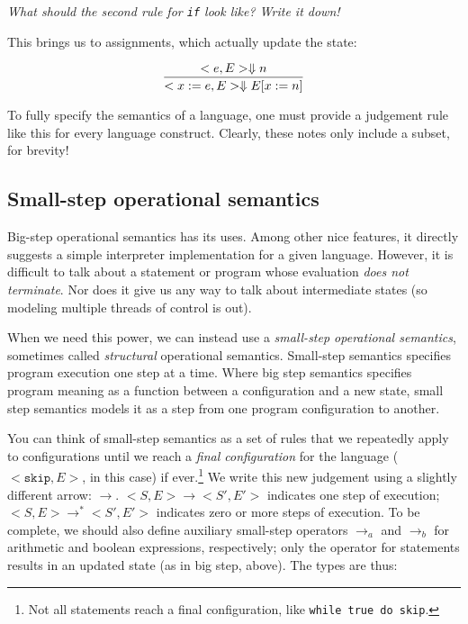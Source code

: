 \documentclass[11pt]{article}
\begin{document}
\noindent \emph{What should the second rule for \texttt{if} look like? Write it down!}

\vspace{1em}

\noindent This brings us to assignments, which actually update the state:

\[
\infer{<x := e, E> \Downarrow E[x := n]} {<e, E> \Downarrow n} 
\]


To fully specify the semantics of a language, one must provide a judgement rule
like this for every language construct.  Clearly, these notes only include a
subset, for brevity!

\subsection{Small-step operational semantics}

Big-step operational semantics has its uses.  Among other
nice features, it directly suggests a simple interpreter
implementation for a given language.  However, it is difficult to talk about a
statement or program whose evaluation \emph{does not terminate}.  Nor does it give us any way
to talk about intermediate states (so modeling multiple threads of control is
out).  

When we need this power, we can instead use a \emph{small-step operational
  semantics}, sometimes called \emph{structural} operational semantics.
Small-step semantics specifies program execution one step at a time.  Where
big step semantics specifies program meaning as a function between a
configuration and a new state, small step semantics models it as a step from one
program configuration to another.  

You can think of small-step semantics as a set of rules that we repeatedly apply to
configurations until we reach a \emph{final configuration} for the language ($<\mathtt{skip}, E>$,
in this case)
if ever.\footnote{Not all statements reach a final configuration, like \texttt{while true do skip}.} 
We write this new judgement using a slightly different arrow:
$\rightarrow$.  $<S, E> \rightarrow <S', E'>$ indicates one step of execution; $<S,
E> \rightarrow^* <S', E'>$ indicates zero or more steps of execution. 
%
To be complete, we should also define auxiliary small-step operators
$\rightarrow_a$ and $\rightarrow_b$ for arithmetic and boolean expressions,
respectively; only the operator for statements results in an updated state (as in big step, above).  The types are thus:
\end{document}
